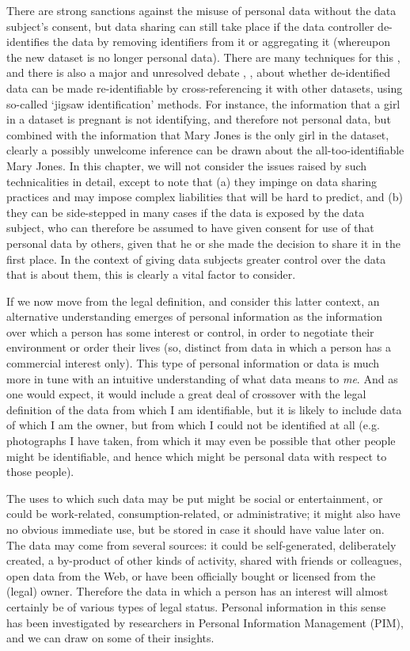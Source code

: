 \documentclass[graybox]{svmult}
\begin{document}
There are strong sanctions against the misuse of personal data without the data subject’s consent, but data sharing can still take place if the data controller de-identifies the data by removing identifiers from it or aggregating it (whereupon the new dataset is no longer personal data). There are many techniques for this \cite{yang2012}, and there is also a major and unresolved debate \cite{ohm2010}, \cite{cavoukian2011}, \cite{narayanan2010} about whether de-identified data can be made re-identifiable by cross-referencing it with other datasets, using so-called `jigsaw identification’ methods. For instance, the information that a girl in a dataset is pregnant is not identifying, and therefore not personal data, but combined with the information that Mary Jones is the only girl in the dataset, clearly a possibly unwelcome inference can be drawn about the all-too-identifiable Mary Jones. In this chapter, we will not consider the issues raised by such technicalities in detail, except to note that (a) they impinge on data sharing practices and may impose complex liabilities that will be hard to predict, and (b) they can be side-stepped in many cases if the data is exposed by the data subject, who can therefore be assumed to have given consent for use of that personal data by others, given that he or she made the decision to share it in the first place. In the context of giving data subjects greater control over the data that is about them, this is clearly a vital factor to consider.

If we now move from the legal definition, and consider this latter context, an alternative understanding emerges of personal information as the information over which a person has some interest or control, in order to negotiate their environment or order their lives (so, distinct from data in which a person has a commercial interest only). This type of personal information or data is much more in tune with an intuitive understanding of what data means to {\em me}. And as one would expect, it would include a great deal of crossover with the legal definition of the data from which I am identifiable, but it is likely to include data of which I am the owner, but from which I could not be identified at all (e.g. photographs I have taken, from which it may even be possible that other people might be identifiable, and hence which might be personal data with respect to those people).

The uses to which such data may be put might be social or entertainment, or could be work-related, consumption-related, or administrative; it might also have no obvious immediate use, but be stored in case it should have value later on. The data may come from several sources: it could be self-generated, deliberately created, a by-product of other kinds of activity, shared with friends or colleagues, open data from the Web, or have been officially bought or licensed from the (legal) owner. Therefore the data in which a person has an interest will almost certainly be of various types of legal status. Personal information in this sense has been investigated by researchers in Personal Information Management (PIM), and we can draw on some of their insights.
\end{document}
